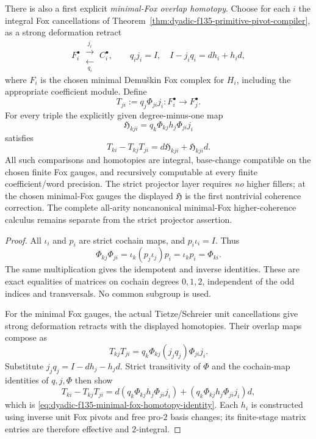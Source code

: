 \begin{theorem}
There is also a
first explicit
\emph{minimal-Fox
overlap homotopy}.
Choose for each
$i$ the integral
Fox cancellations of
Theorem~\ref{thm:dyadic-f135-primitive-pivot-compiler},
as a strong
deformation
retract
\[
F_i^\bullet
\ \substack{\xrightarrow{\ j_i\ }\\[-1ex]
\xleftarrow[\ q_i\ ]{}}\ 
C_i^\bullet,
\qquad
q_i j_i=I,\quad
I-j_iq_i=d h_i+h_i d,
\]
where $F_i$ is the
chosen minimal
Demu\v{s}kin
Fox complex
for $H_i$,
including the
appropriate
coefficient module.
Define
\begin{equation}\label{eq:dyadic-f135-minimal-fox-overlap-maps}
T_{ji}:=q_j\Phi_{ji}j_i:
F_i^\bullet\longrightarrow F_j^\bullet.
\end{equation}
For every triple
the explicitly
given degree-minus-one
map
\begin{equation}\label{eq:dyadic-f135-first-fox-overlap-homotopy}
\boxed{\quad
\mathfrak H_{kji}
=q_k\Phi_{kj}h_j\Phi_{ji}j_i
\quad}
\end{equation}
satisfies
\begin{equation}\label{eq:dyadic-f135-minimal-fox-homotopy-identity}
\boxed{\quad
T_{ki}-T_{kj}T_{ji}
=d\mathfrak H_{kji}
+\mathfrak H_{kji}d.
\quad}
\end{equation}
All such
comparisons and
homotopies are
integral,
base-change
compatible on
the chosen
finite Fox gauges,
and recursively
computable at
every finite
coefficient/word
precision.
The strict
projector layer
requires \emph{no}
higher fillers;
at the chosen
minimal-Fox
gauges the
displayed $\mathfrak H$
is the first
nontrivial
coherence correction.
The complete
all-arity
noncanonical
minimal-Fox
higher-coherence
calculus remains
separate from
the strict
projector assertion.
\end{theorem}

\begin{proof}
All $\iota_i$
and $p_i$
are strict
cochain maps,
and $p_i\iota_i=I$.
Thus
\[
\Phi_{kj}\Phi_{ji}
=\iota_k(p_j\iota_j)p_i
=\iota_kp_i=\Phi_{ki}.
\]
The same
multiplication
gives the
idempotent and
inverse
identities.
These are
exact equalities
of matrices
on cochain
degrees $0,1,2$,
independent of
the odd indices
and transversals.
No common
subgroup is used.

For the minimal
Fox gauges,
the actual
Tietze/Schreier
unit cancellations
give strong
deformation
retracts with
the displayed
homotopies.
Their overlap
maps compose as
\[
T_{kj}T_{ji}
=q_k\Phi_{kj}
(j_jq_j)\Phi_{ji}j_i.
\]
Substitute
$j_jq_j=I-dh_j-h_jd$.
Strict
transitivity of
$\Phi$ and
the cochain-map
identities of
$q,j,\Phi$
then show
\[
T_{ki}-T_{kj}T_{ji}
=d(q_k\Phi_{kj}h_j\Phi_{ji}j_i)
+(q_k\Phi_{kj}h_j\Phi_{ji}j_i)d,
\]
which is
\eqref{eq:dyadic-f135-minimal-fox-homotopy-identity}.
Each $h_i$
is constructed
using inverse
unit Fox pivots
and free
pro-$2$ basis
changes;
its finite-stage
matrix entries
are therefore
effective and
$2$-integral.
\end{proof}

